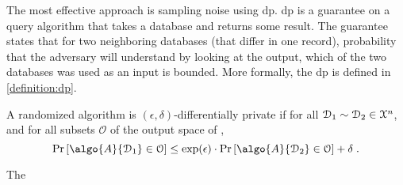 	The most effective approach is sampling noise using \gls{dp}.
	\gls{dp} is a guarantee on a query algorithm that takes a database and returns some result.
	The guarantee states that for two neighboring databases (that differ in one record), probability that the adversary will understand by looking at the output, which of the two databases was used as an input is bounded.
	More formally, the \gls{dp} is defined in \cref{definition:dp}.

	\begin{definition}\label{definition:dp}
		A randomized algorithm  is $(\epsilon, \delta)$-differentially private if for all $\mathcal{D}_1 \sim \mathcal{D}_2 \in \mathcal{X}^{n}$, and for all subsets $\mathcal{O}$ of the output space of ,
		\[
			\probability{ \algo{A}{ \database_1 } \in \mathcal{O} } \leq \exp(\epsilon) \cdot \probability{ \algo{A}{ \database_2 } \in \mathcal{O} } + \delta \; .
		\]
	\end{definition}

	The 
